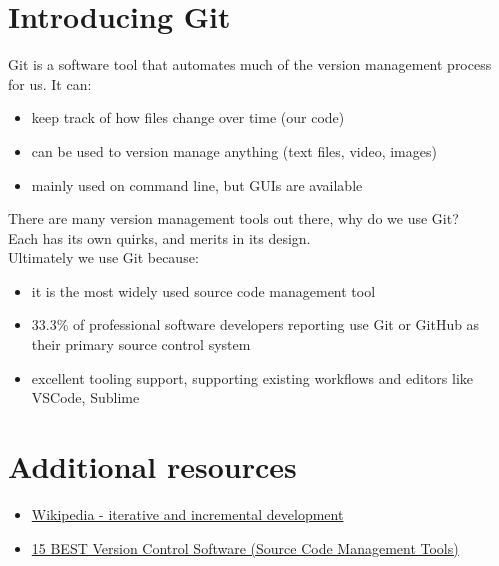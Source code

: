 \section{Introducing Git}

Git is a software tool that automates much of the version management process for us. It can:

\begin{itemize}
    \item keep track of how files change over time (our code)
    \item can be used to version manage anything (text files, video, images)
    \item mainly used on command line, but GUIs are available
\end{itemize}

There are many version management tools out there, why do we use Git?
\\

Each has its own quirks, and merits in its design.
\\

Ultimately we use Git because:

\begin{itemize}
    \item it is the most widely used source code management tool
	\item 33.3\% of professional software developers reporting use Git or GitHub as their primary source control system
	\item excellent tooling support, supporting existing workflows and editors like VSCode, Sublime
\end{itemize}


\section{Additional resources}

\begin{itemize}[leftmargin=*]
    \item \href{https://en.wikipedia.org/wiki/Iterative_and_incremental_development}{Wikipedia - iterative and incremental development }
    \item \href{https://www.softwaretestinghelp.com/version-control-software/}{15 BEST Version Control Software (Source Code Management Tools) }
	
\end{itemize}